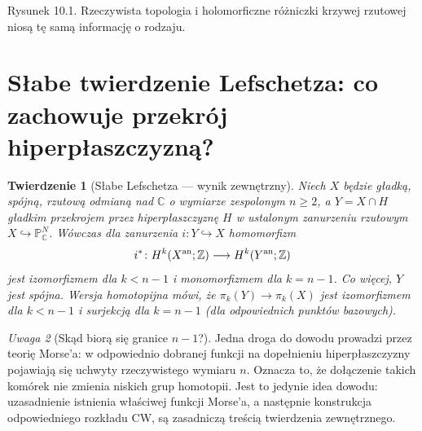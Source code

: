 \documentclass[11pt,a4paper,openany]{report}
\numberwithin{equation}{section}
\theoremstyle{plain}
\newtheorem{twierdzenie}{Twierdzenie}[section]
\theoremstyle{definition}
\theoremstyle{remark}
\newtheorem{uwaga}[twierdzenie]{Uwaga}
\newcommand{\Z}{\mathbb Z}
\newcommand{\C}{\mathbb C}
\newcommand{\PP}{\mathbb P}
\begin{document}
\begin{center}

{\small Rysunek 10.1. Rzeczywista topologia i holomorficzne różniczki
krzywej rzutowej niosą tę samą informację o rodzaju.}\par
\end{center}

\section{Słabe twierdzenie Lefschetza: co zachowuje przekrój hiperpłaszczyzną?}
\label{sec:ga10-weak}

\begin{twierdzenie}[Słabe Lefschetza — wynik zewnętrzny]
\label{tw:ga10-weak}
Niech $X$ będzie gładką, spójną, rzutową odmianą nad $\C$
o wymiarze zespolonym $n\ge2$, a $Y=X\cap H$ gładkim
przekrojem przez hiperpłaszczyznę $H$ w ustalonym zanurzeniu
rzutowym $X\hookrightarrow\PP^N_\C$.
Wówczas dla zanurzenia $i\colon Y\hookrightarrow X$ homomorfizm
\[
 i^*\colon H^k(X^{\rm an};\Z)\longrightarrow
 H^k(Y^{\rm an};\Z)
\]
jest izomorfizmem dla $k<n-1$ i monomorfizmem dla $k=n-1$.
Co więcej, $Y$ jest spójna. Wersja homotopijna mówi, że
$\pi_k(Y)\to\pi_k(X)$ jest izomorfizmem dla $k<n-1$
i surjekcją dla $k=n-1$ (dla odpowiednich punktów bazowych).
\end{twierdzenie}

\begin{uwaga}[Skąd biorą się granice $n-1$?]
Jedna droga do dowodu prowadzi przez teorię Morse'a:
w odpowiednio dobranej funkcji na dopełnieniu hiperpłaszczyzny
pojawiają się uchwyty rzeczywistego wymiaru $n$.
Oznacza to, że dołączenie takich komórek nie zmienia
niskich grup homotopii. Jest to jedynie idea dowodu:
uzasadnienie istnienia właściwej funkcji Morse'a,
a następnie konstrukcja odpowiedniego rozkładu CW,
są zasadniczą treścią twierdzenia zewnętrznego.
\end{uwaga}
\end{document}

